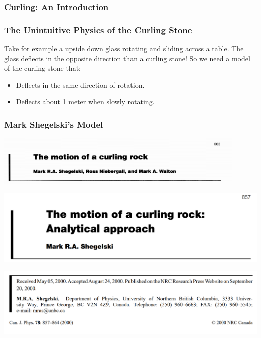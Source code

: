 \documentclass{beamer}
\begin{document}
\begin{frame}\frametitle{Curling: An Introduction}
\end{frame}

\begin{frame}\frametitle{The Unintuitive Physics of the Curling Stone}
    Take for example a upside down glass rotating and sliding across a table. The glass deflects in the opposite direction than a curling stone!
    So we need a model of the curling stone that:
    \begin{itemize}
        \item Deflects in the same direction of rotation.
        \item Deflects about 1 meter when slowly rotating.
    \end{itemize}
\end{frame}

\begin{frame}\frametitle{Mark Shegelski's Model}
    \centering
    \includegraphics[width=0.9\textwidth]{Images/M_Shegelski_1996.png}

    \includegraphics[width=1.0\textwidth]{Images/M_Shegelski_2000.png}

    \includegraphics[width=1.0\textwidth]{Images/M_Shegelski_2000_Affl.png}
\end{frame}
\end{document}
